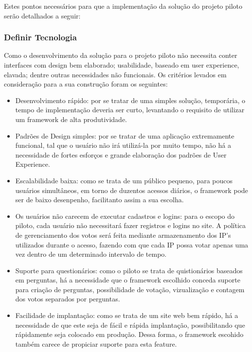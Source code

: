Estes pontos necessários para que a implementação da solução do projeto piloto serão detalhados a seguir:

\subsubsection{Definir Tecnologia}
\label{sub:definir_tecnologia}
Como o desenvolvimento da solução para o projeto piloto não necessita conter interfaces com design bem elaborado;
usabilidade, baseado em user experience, elavada; dentre outras necessidades não funcionais. Os critérios levados em
consideração para a sua construção foram os seguintes:

\begin{itemize}
    \item Desenvolvimento rápido: por se tratar de uma simples solução, temporária, o tempo de implementação deveria
        ser curto, levantando o requisito de utilizar um framework de alta produtividade.
    \item Padrões de Design simples: por se tratar de uma aplicação extremamente funcional, tal que o usuário não irá
        utilizá-la por muito tempo, não há a necessidade de fortes esforços e grande elaboração dos padrões de
        User Experience.
    \item Escalabilidade baixa: como se trata de um público pequeno, para poucos usuários simultâneos, em torno de duzentos
        acessos diários, o framework pode ser de baixo desenpenho, facilitanto assim a sua escolha.
    \item Os usuários não carecem de executar cadastros e logins: para o escopo do piloto, cada usuário não necessitará
        fazer registros e logins no site. A política de gerenciamento dos votos será feita mediante armazenamento dos
        IP's utilizados durante o acesso, fazendo com que cada IP possa votar apenas uma vez dentro de um determinado
        intervalo de tempo.
    \item Suporte para questionários: como o piloto se trata de quistionários baseados em perguntas, há a necessidade que o framework
        escolhido conceda suporte para criação de perguntas, possibilidade de votação, vizualização e contagem dos votos
        separados por perguntas.
    \item Facilidade de implantação: como se trata de um site web bem rápido, há a necessidade de que este seja de fácil e rápida
        implantação, possibilitando que rápidamente seja colocado em produção. Dessa forma, o framework escohido também carece
        de propiciar suporte para esta feature.
\end{itemize}

